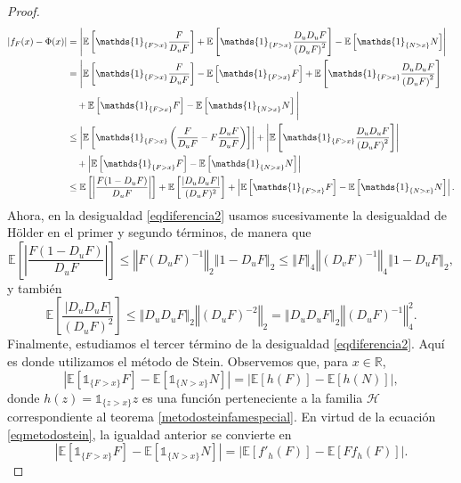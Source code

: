 \documentclass[letterpaper,twoside,12pt]{book}
\newcommand{\R}{\mathbb{R}}
\newcommand{\E}{\mathbb{E}}
\newcommand{\1}{\mathds{1}}
\newcommand{\abs}[1]{\left\lvert #1 \right\rvert}
\newcommand{\norm}[1]{\left\Vert #1 \right\Vert}
\theoremstyle{definition}
\theoremstyle{definition}
\theoremstyle{remark}
\theoremstyle{definition}
\theoremstyle{definition}
\theoremstyle{definition}
\theoremstyle{definition}
\theoremstyle{definition}
\begin{document}
\begin{proof}
\begin{align}\label{eqdiferencia2}
   \abs{f_F(x)-\Phi(x)}&=\abs{\E\left[\1_{\{F>x\}}\frac{F}{D_{u}F}\right]+\E\left[\1_{\{F>x\}}\frac{D_uD_uF}{\left(D_{u}F\right)^2}\right]-\E\left[\1_{\{N>x\}}N\right]}\notag\\
   &=\Bigg|\E\left[\1_{\{F>x\}}\frac{F}{D_{u}F}\right]-\E\left[\1_{\{F>x\}}F\right]+\E\left[\1_{\{F>x\}}\frac{D_uD_uF}{\left(D_{u}F\right)^2}\right]\notag\\
   &\ \ \ +\E\left[\1_{\{F>x\}}F\right]-\E\left[\1_{\{N>x\}}N\right]\Bigg|\notag\\
   &\leq \abs{\E\left[\1_{\{F>x\}}\left(\frac{F}{D_uF}-F\frac{D_uF}{D_uF}\right)\right]}+\abs{\E\left[\1_{\{F>x\}}\frac{D_uD_uF}{\left(D_{u}F\right)^2}\right]}\notag\\
   &\ \ \ +\abs{\E\left[\1_{\{F>x\}}F\right]-\E\left[\1_{\{N>x\}}N\right]}\notag\\
   &\leq \E\left[\abs{\frac{F(1-D_uF)}{D_uF}}\right]+\E\left[\frac{\abs{D_uD_uF}}{(D_uF)^2}\right]+\abs{\E\left[\1_{\{F>x\}}F\right]-\E\left[\1_{\{N>x\}}N\right]}.
\end{align}
Ahora, en la desigualdad \eqref{eqdiferencia2} usamos sucesivamente la desigualdad de Hölder en el primer y segundo términos, de manera que
\begin{equation}\label{eqdiferencia3}
   \E\left[\abs{\frac{F(1-D_uF)}{D_uF}}\right]\leq \norm{F(D_uF)^{-1}}_2\norm{1-D_uF}_2\leq \norm{F}_4\norm{(D_vF)^{-1}}_4\norm{1-D_uF}_2,
\end{equation}
y también
\begin{equation}\label{eqdiferencia4}
   \E\left[\frac{\abs{D_uD_uF}}{(D_uF)^2}\right]\leq \norm{D_uD_uF}_2\norm{(D_uF)^{-2}}_2=\norm{D_uD_uF}_2\norm{(D_uF)^{-1}}_4^{2}.
\end{equation}
Finalmente, estudiamos el tercer término de la desigualdad \eqref{eqdiferencia2}. Aquí es donde utilizamos el método de Stein. Observemos que, para $x\in \R$,
\[
   \abs{\E\left[\1_{\{F>x\}}F\right]-\E\left[\1_{\{N>x\}}N\right]}=\abs{\E\left[h(F)\right]-\E\left[h(N)\right]},
\]
donde $h(z)=\1_{\{z>x\}}z$ es una función perteneciente a la familia $\mathscr{H}$ correspondiente al teorema \ref{metodosteinfamespecial}. En virtud de la ecuación \eqref{eqmetodostein}, la igualdad anterior se convierte en
\begin{equation}\label{eqdiferencia5}
   \abs{\E\left[\1_{\{F>x\}}F\right]-\E\left[\1_{\{N>x\}}N\right]}=\abs{\E\left[f'_h(F)\right]-\E\left[Ff_h(F)\right]}.
\end{equation}

\end{proof}
\end{document}
